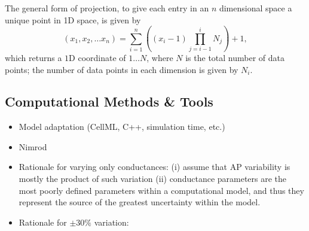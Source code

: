 \documentclass[../thesis-main.tex]{subfiles}
\begin{document}
 The general form of projection, to give each entry in an $n$ dimensional space a unique point in 1D space, is given by
 \begin{equation}
  (x_1, x_2, \ldots x_n) = \sum_{i=1}^n\left((x_i-1)\prod_{j=i-1}^i N_j\right) + 1,
  \label{eq:paramSpace-projection}
 \end{equation}
 which returns a $1$D coordinate of $1\ldots{}N$, where $N$ is the total number of data points; the number of data points in each dimension is given by $N_i$.
 
 \subsection{Computational Methods \& Tools}
 \label{subsec:comp-methods}
 \begin{itemize}
  \item Model adaptation (CellML, C++, simulation time, etc.)
  \item Nimrod
  \item Rationale for varying only conductances: (i) assume that AP variability is mostly the product of such variation (ii) conductance parameters are the most poorly defined parameters within a computational model, and thus they represent the source of the greatest uncertainty within the model.
  \item Rationale for $\pm30\%$ variation:
 \end{itemize}
\end{document}
